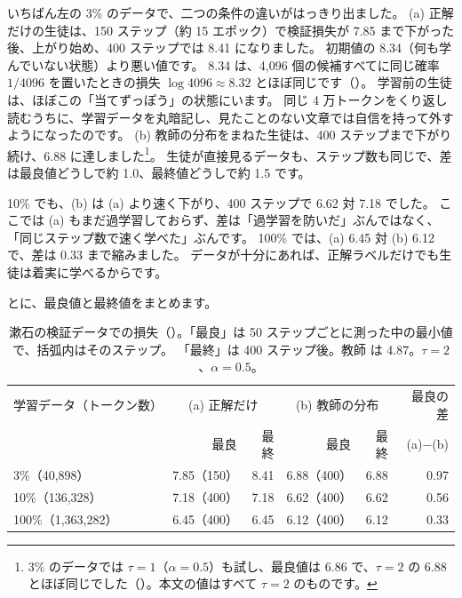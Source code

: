 いちばん左の 3\% のデータで、二つの条件の違いがはっきり出ました。
(a) 正解だけの生徒は、150 ステップ（約 15 エポック）で検証損失が 7.85 まで下がった後、上がり始め、400 ステップでは 8.41 になりました。
初期値の 8.34（何も学んでいない状態）より悪い値です。
8.34 は、4,096 個の候補すべてに同じ確率 $1/4096$ を置いたときの損失 $\log 4096\approx8.32$ とほぼ同じです（）。
学習前の生徒は、ほぼこの「当てずっぽう」の状態にいます。
同じ 4 万トークンをくり返し読むうちに、学習データを丸暗記し、見たことのない文章では自信を持って外すようになったのです。
(b) 教師の分布をまねた生徒は、400 ステップまで下がり続け、6.88 に達しました\footnote{3\% のデータでは $\tau=1$（$\alpha=0.5$）も試し、最良値は 6.86 で、$\tau=2$ の 6.88 とほぼ同じでした（）。本文の値はすべて $\tau=2$ のものです。}。
生徒が直接見るデータも、ステップ数も同じで、差は最良値どうしで約 1.0、最終値どうしで約 1.5 です。

10\% でも、(b) は (a) より速く下がり、400 ステップで 6.62 対 7.18 でした。
ここでは (a) もまだ過学習しておらず、差は「過学習を防いだ」ぶんではなく、「同じステップ数で速く学べた」ぶんです。
100\% では、(a) 6.45 対 (b) 6.12 で、差は 0.33 まで縮みました。
データが十分にあれば、正解ラベルだけでも生徒は着実に学べるからです。

とに、最良値と最終値をまとめます。

\begin{table}[tbp]
\centering
\caption{漱石の検証データでの損失（）。「最良」は 50 ステップごとに測った中の最小値で、括弧内はそのステップ。
「最終」は 400 ステップ後。教師  は 4.87。$\tau=2$、$\alpha=0.5$。}
\label{tab:distill-results}
\small
\begin{tabular}{lrrrrr}
\toprule
学習データ（トークン数） & \multicolumn{2}{c}{(a) 正解だけ} & \multicolumn{2}{c}{(b) 教師の分布} & 最良の差 \\
 & 最良 & 最終 & 最良 & 最終 & (a)$-$(b) \\
\midrule
3\%（40,898） & 7.85（150） & 8.41 & 6.88（400） & 6.88 & 0.97 \\
10\%（136,328） & 7.18（400） & 7.18 & 6.62（400） & 6.62 & 0.56 \\
100\%（1,363,282） & 6.45（400） & 6.45 & 6.12（400） & 6.12 & 0.33 \\
\bottomrule
\end{tabular}
\end{table}


